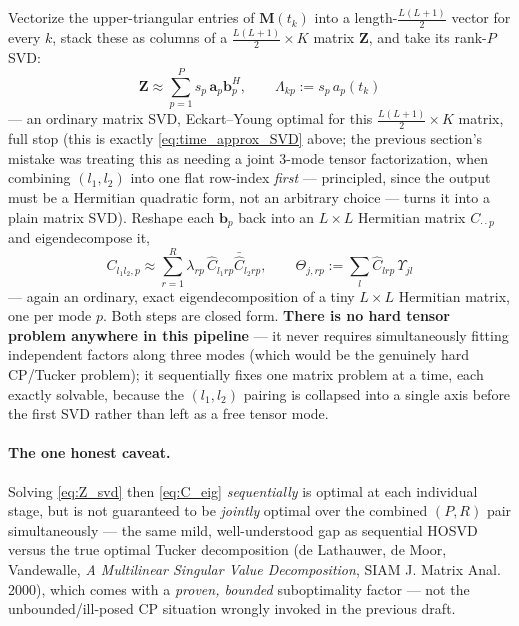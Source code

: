 \documentclass{article}
\begin{document}
Vectorize the upper-triangular entries of $\mathbf{M}(t_k)$ into a length-$\tfrac{L(L+1)}{2}$
vector for every $k$, stack these as columns of a $\tfrac{L(L+1)}{2}\times K$ matrix
$\mathbf{Z}$, and take its rank-$P$ SVD:
\begin{equation}
    \mathbf{Z} \approx \sum_{p=1}^P s_p\,\mathbf{a}_p\mathbf{b}_p^H,
    \qquad \Lambda_{kp} := s_p\,a_p(t_k)
    \label{eq:Z_svd}
\end{equation}
— an ordinary matrix SVD, Eckart--Young optimal for this $\tfrac{L(L+1)}{2}\times K$ matrix, full
stop (this is exactly \eqref{eq:time_approx_SVD} above; the previous section's mistake was
treating this as needing a joint 3-mode tensor factorization, when combining $(l_1,l_2)$ into one
flat row-index \emph{first} — principled, since the output must be a Hermitian quadratic form,
not an arbitrary choice — turns it into a plain matrix SVD). Reshape each $\mathbf{b}_p$ back into
an $L\times L$ Hermitian matrix $C_{\cdot\cdot p}$ and eigendecompose it,
\begin{equation}
    C_{l_1l_2,p} \approx \sum_{r=1}^R \lambda_{rp}\,\hat C_{l_1rp}\bar{\hat C}_{l_2rp},
    \qquad \Theta_{j,rp} := \sum_l \hat C_{lrp}\,\Upsilon_{jl}
    \label{eq:C_eig}
\end{equation}
— again an ordinary, exact eigendecomposition of a tiny $L\times L$ Hermitian matrix, one per
mode $p$. Both steps are closed form. \textbf{There is no hard tensor problem anywhere in this
pipeline} — it never requires simultaneously fitting independent factors along three modes
(which would be the genuinely hard CP/Tucker problem); it sequentially fixes one matrix problem
at a time, each exactly solvable, because the $(l_1,l_2)$ pairing is collapsed into a single axis
before the first SVD rather than left as a free tensor mode.

\paragraph{The one honest caveat.} Solving \eqref{eq:Z_svd} then \eqref{eq:C_eig} \emph{sequentially}
is optimal at each individual stage, but is not guaranteed to be \emph{jointly} optimal over the
combined $(P,R)$ pair simultaneously — the same mild, well-understood gap as sequential HOSVD
versus the true optimal Tucker decomposition (de Lathauwer, de Moor, Vandewalle, \emph{A
Multilinear Singular Value Decomposition}, SIAM J. Matrix Anal. 2000), which comes with a
\emph{proven, bounded} suboptimality factor — not the unbounded/ill-posed CP situation wrongly
invoked in the previous draft.
\end{document}
